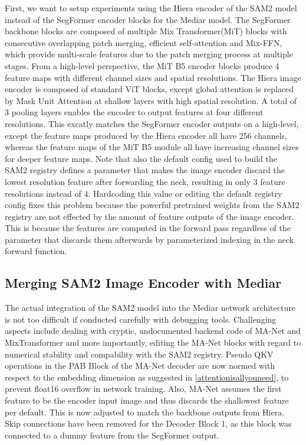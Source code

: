 First, we want to setup experiments using the Hiera encoder of the SAM2 model instead of the SegFormer encoder blocks for the Mediar model. The SegFormer backbone blocks are composed of multiple Mix Transformer(MiT) blocks with consecutive overlapping patch merging, efficient self-attention and Mix-FFN, which provide multi-scale features due to the patch merging process at multiple stages. From a high-level perspective, the MiT B5 encoder blocks produce 4 feature maps with different channel sizes and spatial resolutions. 
The Hiera image encoder is composed of standard ViT blocks, except global attention is replaced by Mask Unit Attention at shallow layers with high spatial resolution. A total of 3 pooling layers enables the encoder to output features at four different resolutions. This excatly matches the SegFormer encoder outputs on a high-level, except the feature maps produced by the Hiera encoder all have 256 channels, whereas the feature maps of the MiT B5 module all have increasing channel sizes for deeper feature maps. Note that also the default config used to build the SAM2 registry defines a parameter that makes the image encoder discard the lowest resolution feature after forwarding the neck, resulting in only 3 feature resolutions instead of 4. Hardcoding this value or editing the default registry config fixes this problem because the powerful pretrained weights from the SAM2 registry are not effected by the amount of feature outputs of the image encoder. This is because the features are computed in the forward pass regardless of the parameter that discards them afterwards by parameterized indexing in the neck forward function.

\subsection{Merging SAM2 Image Encoder with Mediar}

The actual integration of the SAM2 model into the Mediar network architecture is not too difficult if conducted carefully with debugging tools. Challenging aspects include dealing with cryptic, undocumented backend code of MA-Net and MixTransformer and more importantly, editing the MA-Net blocks with regard to numerical stability and compability with the SAM2 registry. Pseudo QKV operations in the PAB Block of the MA-Net decoder are now normed with respect to the embedding dimension as suggested in \ref{attentionisallyouneed}, to prevent float16 overflow in network training. Also, MA-Net assumes the first feature to be the encoder input image and thus discards the shallowest feature per default. This is now adjusted to match the backbone outputs from Hiera. Skip connections have been removed for the Decoder Block 1, as this block was connected to a dummy feature from the SegFormer output. 

